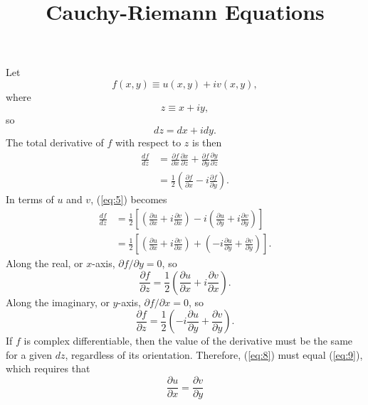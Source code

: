 \documentclass[a4paper, 12pt]{article}
\title{Cauchy-Riemann Equations}
\author{}
\date{}
\begin{document}
\maketitle

Let
\begin{equation}
f(x,y)\equiv u(x,y)+iv(x,y),
\end{equation}
where
\begin{equation}
z \equiv x+iy,
\end{equation}
so
\begin{equation}
dz=dx+idy.
\end{equation}
The total derivative of $f$ with respect to $z$ is then
\begin{align}
    \frac{df}{dz}&=\frac{\partial f}{\partial x}\frac{\partial x}{\partial z}+\frac{\partial f}{\partial y}\frac{\partial y}{\partial z}\\
    &=\frac{1}{2}\left(\frac{\partial f}{\partial x} - i\frac{\partial f}{\partial y}\right).\label{eq:5}
\end{align}
In terms of $u$ and $v$, (\ref{eq:5}) becomes 
\begin{align}
\frac{df}{dz}&=\frac{1}{2}\left[\left(\frac{\partial u}{\partial x}+i\frac{\partial v}{\partial x}\right)-i\left(\frac{\partial u}{\partial y} + i\frac{\partial v}{\partial y}\right)\right]\\
&=\frac{1}{2}\left[\left(\frac{\partial u}{\partial x}+i\frac{\partial v}{\partial x}\right)+\left(-i\frac{\partial u}{\partial y} + \frac{\partial v}{\partial y}\right)\right].
\end{align}
Along the real, or $x$-axis, $\partial f/\partial y=0$, so
\begin{equation}\label{eq:8}
    \frac{\partial f}{\partial z} = \frac{1}{2}\left(\frac{\partial u}{\partial x} + i\frac{\partial v}{\partial x}\right).
\end{equation}
Along the imaginary, or $y$-axis, $\partial f/\partial x = 0$, so
\begin{equation}\label{eq:9}
    \frac{\partial f}{\partial z} = \frac{1}{2}\left(-i\frac{\partial u}{\partial y} + \frac{\partial v}{\partial y}\right).
\end{equation}
If $f$ is complex differentiable, then the value of the derivative must be the same for a given $dz$, regardless of its orientation. Therefore, (\ref{eq:8}) must equal (\ref{eq:9}), which requires that
\begin{equation}
    \frac{\partial u}{\partial x} = \frac{\partial v}{\partial y}
\end{equation}
\end{document}
